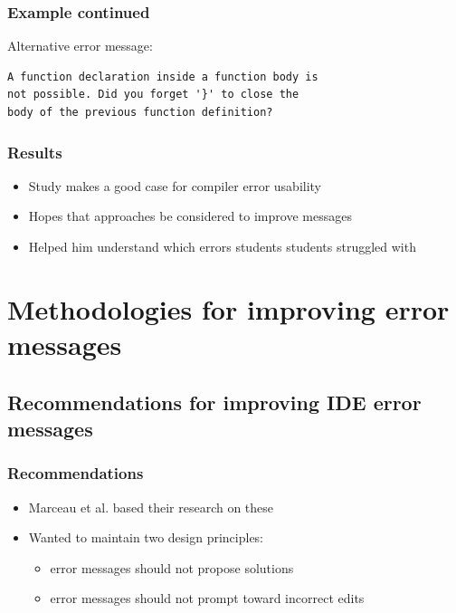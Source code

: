 \documentclass{beamer}
\begin{document}
\begin{frame}[fragile]
	\frametitle{Example continued}
Alternative error message:
\begin{verbatim}
A function declaration inside a function body is 
not possible. Did you forget '}' to close the 
body of the previous function definition?
\end{verbatim}

\end{frame}

\begin{frame}
	\frametitle{Results}
		\begin{itemize}
			\item Study makes a good case for compiler error usability
			\item Hopes that approaches be considered to improve messages
			\item Helped him understand which errors students students struggled with
		\end{itemize}

\end{frame}

\section[Methodologies]{Methodologies for improving error messages}

\subsection[DrRacket recommendations]{Recommendations for improving IDE error messages}

\begin{frame}
	\frametitle{Recommendations}
		\begin{itemize}
			\item Marceau et al. based their research on these 
			\item Wanted to maintain two design principles:
			\begin{itemize}
				\item error messages should not propose solutions
				\item error messages should not prompt toward incorrect edits
			\end{itemize}
		\end{itemize}

\end{frame}
\end{document}
